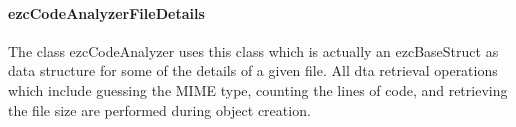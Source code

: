 \documentclass[10pt,final,a4paper,oneside]{article}
\begin{document}


\paragraph{ezcCodeAnalyzerFileDetails}
The class ezcCodeAnalyzer uses this class
which is actually an ezcBaseStruct
as data structure for some of the details of a given file.
All dta retrieval operations which include
guessing the MIME type, counting the lines of code,
and retrieving the file size
are performed during object creation.

\end{document}
